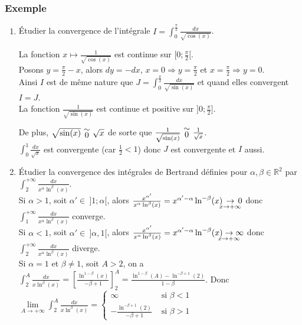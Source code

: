 \documentclass[a4paper,10pt]{book} %
\newcommand{\R}{\mathbb{R}}
\newcommand{\equi}[1]{\renewcommand{\arraystretch}{0.3}~\begin{matrix}\sim\\#1\end{matrix}~\renewcommand{\arraystretch}{1}}
\newcommand{\displayAmath}{\displaystyle}
\begin{document}
\subsubsection{Exemple}
\begin{enumerate}
\item 
Étudier la convergence de l'intégrale $\displayAmath I=\int_0^{\frac{\pi}{2}} \frac{dx}{\sqrt{\cos(x)}}$.

La fonction $x\mapsto \frac{1}{\sqrt{\cos(x)}}$ est continue sur $[0;\frac{\pi}{2}[$.\\
Posons $y=\frac{\pi}{2}-x$, alors $dy=-dx$,
$x=0 \Rightarrow y=\frac{\pi}{2}$ et
$x=\frac{\pi}{2} \Rightarrow y=0$.\\

Ainsi $I$ est de même nature que $\displayAmath J=\int_0^{\frac{\pi}{2}}\frac{dx}{\sqrt{\sin(x)}}$ et quand elles convergent $I=J$.\\

La fonction $\frac{1}{\sqrt{\sin(x)}}$ est continue et positive sur $]0;\frac{\pi}{2}]$.

De plus, $\sqrt{\sin(x)}\equi{0}\sqrt{x}$ de sorte que $\frac{1}{\sqrt{\sin(x)}}\equi{0}\frac{1}{\sqrt{x}}$.\\

$\displayAmath\int_0^1\frac{dx}{\sqrt{x}}$ est convergente (car $\frac{1}{2}<1$) donc $J$ est convergente et $I$ aussi.\\

\item Étudier la convergence des intégrales de Bertrand définies pour $\alpha,\beta\in\R^2$ par $\displayAmath\int_2^{+\infty} \frac{dx}{x^\alpha\ln^\beta(x)}$.\\

Si $\alpha>1$, soit $\alpha'\in~]1;\alpha[$, alors $\frac{x^{\alpha'}}{x^\alpha\ln^\beta(x)}=x^{\alpha'-\alpha}\ln^{-\beta}(x) \underset{~~\mathclap{x\rightarrow +\infty}~~}{\rightarrow}0$ donc $\displayAmath\int_1^{+\infty}\frac{dx}{x^\alpha\ln^{\beta}(x)}$ converge.\\

Si $\alpha < 1$, soit $\alpha'\in~]\alpha,1[$, alors
$\frac{x^{\alpha'}}{x^\alpha\ln^\beta(x)} =x^{\alpha'-\alpha}\ln^{-\beta}(x)\underset{\mathclap{x\rightarrow+\infty}}{\rightarrow}\infty$ donc $\displayAmath\int_{2}^{+\infty}\frac{dx}{x^\alpha\ln^\beta(x)}$ diverge.\\

Si $\alpha = 1$ et $\beta\neq 1$, soit $A>2$, on a
$\displayAmath\int_{2}^{A}\frac{dx}{x\ln^\beta(x)}=\left[\frac{\ln^{1-\beta}(x)}{-\beta +1}\right]_2^A=\frac{\ln^{1-\beta}(A)-\ln^{-\beta +1}(2)}{1-\beta}$.
Donc $\displayAmath \lim\limits_{A\rightarrow +\infty}\int_2^A\frac{dx}{x\ln^\beta(x)}=\left\{ \begin{array}{cl}
\infty &\text{ si } \beta<1\\
\displayAmath -\frac{\ln^{-\beta +1}(2)}{-\beta+1} & \text{ si }\beta>1
\end{array}\right.$\\\\


\end{enumerate}
\end{document}

